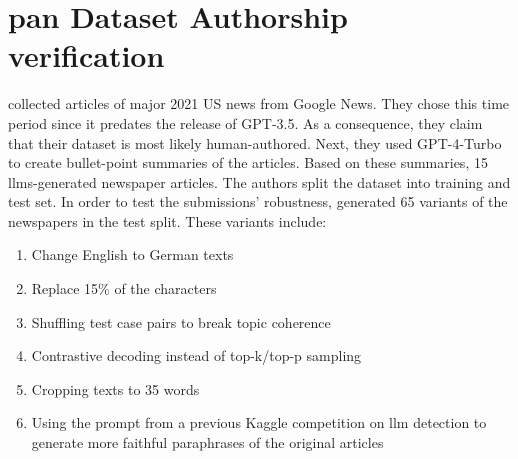 \section{\acs{pan} Dataset Authorship verification}
\label{sec:pan_dataset_authorship_verification}

\citet{ayele_overview_nodate} collected articles of major 2021 US news from Google News.
They chose this time period since it predates the release of GPT-3.5.
As a consequence, they claim that their dataset is most likely human-authored.
Next, they used GPT-4-Turbo to create bullet-point summaries of the articles. 
Based on these summaries, 15 \acp{llm}-generated newspaper articles.
The authors split the dataset into training and test set.
In order to test the submissions' robustness, \citet{ayele_overview_nodate} generated 65 variants of the newspapers in the test split.
These variants include:
\begin{enumerate}
    \item Change English to German texts
    \item Replace 15\% of the characters
    \item Shuffling test case pairs to break topic coherence 
    \item Contrastive decoding instead of top-k/top-p sampling
    \item Cropping texts to 35 words
    \item Using the prompt from a previous Kaggle competition on \ac{llm} detection to generate more faithful paraphrases of the original articles
\end{enumerate}